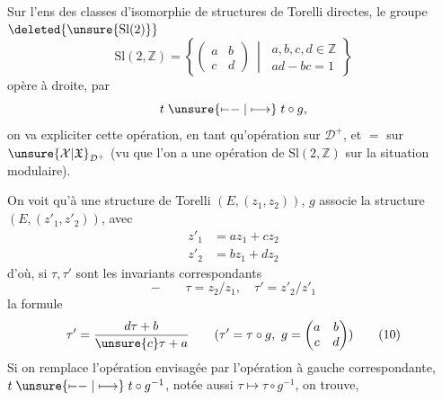 Sur l'ens des  classes d'isomorphie de structures de Torelli directes, le groupe
$\deleted{\unsure{\mathrm{Sl}(2)}}$
\begin{equation}
\mathrm{Sl}(2,\mathbb Z)=
\left\{\begin{pmatrix}a&b\\c&d\end{pmatrix}
\ \middle|\ 
\begin{gathered}
a,b,c,d\in\mathbb Z\\
ad-bc=1
\end{gathered}\right\}
\tag{9}
\end{equation}
opère à droite, par
\[
t\mathrel{\unsure{\mapstochar\relbar\relbar|\longmapsto}}t\circ g,
\]
on va expliciter cette opération, en tant qu'opération sur $\mathcal D^+$, et $=$ sur $\unsure{\mathcal X|\mathfrak X}_{\mathcal D^+}$ (vu que l'on a une opération de $\mathrm{Sl}(2,\mathbb Z)$ sur la situation modulaire).

On voit qu'à une structure de Torelli $(E,(z_1,z_2))$, $g$ associe la structure $(E,(z'_1,z'_2))$, avec
\[
\begin{aligned}
z'_1&=az_1+cz_2\\
z'_2&=bz_1+dz_2
\end{aligned}
\]
d'où, si $\tau,\tau'$ sont les invariants correspondants
\[
-\qquad\tau=z_2/z_1,\quad\tau'=z'_2/z'_1
\]
la formule
\begin{equation}
\tau'=\frac{d\tau+b}{\unsure{c}\tau+a}
\qquad
(\tau'=\tau\circ g,\ g=\begin{pmatrix}a&b\\c&d\end{pmatrix})
\tag{10}
\end{equation}
Si on remplace l'opération envisagée par l'opération à gauche correspondante,  $t\mathrel{\unsure{\mapstochar\relbar\relbar|\longmapsto}}t\circ g^{-1}$, notée aussi $\tau\longmapsto\tau\circ g^{-1}$, on trouve,

